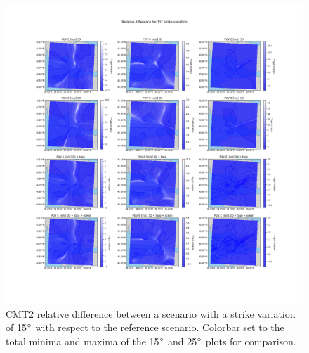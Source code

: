 \documentclass[../Text/00main.tex]{subfiles}
\begin{document}
\begin{figure}[!htp]
    \centering
    \includegraphics[width=1.2\linewidth]{images_results/strike_variation_epsilon12_sc2.png}
    \caption{CMT2 relative difference between a scenario with a strike variation of 15$\degree$ with respect to the reference scenario. Colorbar set to the total minima and maxima of the 15$\degree$ and 25$\degree$ plots for comparison.}
    \label{fig:ref_eps12-2}
\end{figure}
\end{document}
